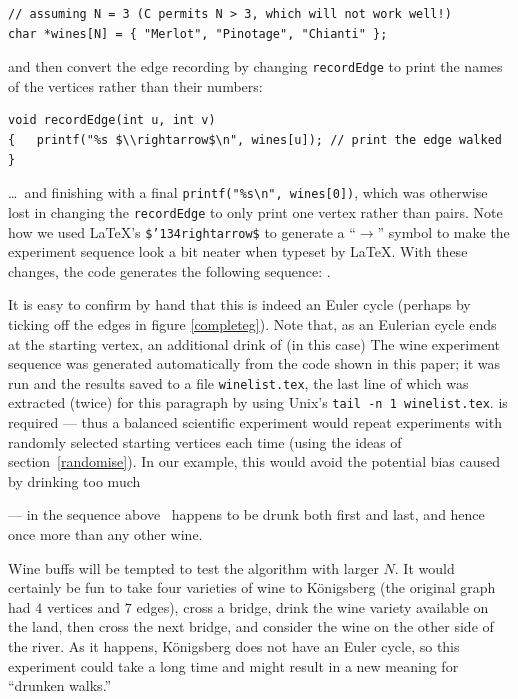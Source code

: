 \documentclass[12pt]{article}
\begin{document}
\begin{verbatim}
// assuming N = 3 (C permits N > 3, which will not work well!)
char *wines[N] = { "Merlot", "Pinotage", "Chianti" }; 
\end{verbatim}

and then convert the edge recording by changing \texttt{recordEdge} to print the names of the vertices rather than their numbers: 

\begin{Verbatim}
void recordEdge(int u, int v) 
{   printf("%s $\\rightarrow$\n", wines[u]); // print the edge walked
}
\end{Verbatim}

\label{winelist}
\ldots\ and finishing with a final \verb|printf("%s\n", wines[0])|, which was otherwise lost in changing the \verb|recordEdge| to only print one vertex rather than pairs. Note how we used \LaTeX's \texttt{\$\char'134rightarrow\$} to generate a ``$\rightarrow$'' symbol to make the experiment sequence look a bit neater when typeset by \LaTeX\@. With these changes, the code generates the following sequence: \unskip.

It is easy to confirm by hand that this is indeed an Euler cycle (perhaps by ticking off the edges in figure \ref{completeg}). Note that, as an Eulerian cycle ends at the starting vertex, an additional drink of (in this case) %
{The wine experiment sequence was generated automatically from the code shown in this paper; it was run and the results saved to a file \texttt{winelist.tex}, the last line of which was extracted (twice) for this paragraph by using Unix's \texttt{tail -n 1 winelist.tex}.} is required --- thus a balanced scientific experiment would repeat experiments with randomly selected starting vertices each time (using the ideas of section~\ref{randomise}). In our example, this would avoid the potential bias caused by drinking too much 
 
--- in the sequence above 
\unskip\ 
happens to be drunk both first and last, and hence once more than any other wine.


Wine buffs will be tempted to test the algorithm with larger $N$\@. It would certainly be fun to take four varieties of wine to K\"onigsberg (the original graph had $4$ vertices and $7$ edges), cross a bridge, drink the wine variety available on the land, then cross the next bridge, and consider the wine on the other side of the river. As it happens, K\"onigsberg does not have an Euler cycle, so this experiment could take a long time and might result in a new meaning for ``drunken walks.''
\end{document}
